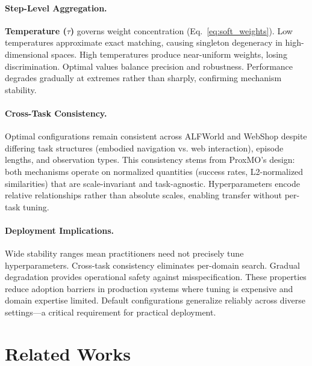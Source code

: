 \documentclass[11pt]{article}
\begin{document}
\paragraph{Step-Level Aggregation.}
\textbf{Temperature ($\tau$)} governs weight concentration (Eq.~\ref{eq:soft_weights}). 
Low temperatures approximate exact matching, causing singleton degeneracy in 
high-dimensional spaces. High temperatures produce near-uniform weights, losing 
discrimination. Optimal values balance precision and robustness. Performance 
degrades gradually at extremes rather than sharply, confirming mechanism stability.

\paragraph{Cross-Task Consistency.}
Optimal configurations remain consistent across ALFWorld and WebShop despite 
differing task structures (embodied navigation vs. web interaction), episode 
lengths, and observation types. This consistency stems from ProxMO's design: 
both mechanisms operate on normalized quantities (success rates, L2-normalized 
similarities) that are scale-invariant and task-agnostic. Hyperparameters encode 
relative relationships rather than absolute scales, enabling transfer without 
per-task tuning.

\paragraph{Deployment Implications.}
Wide stability ranges mean practitioners need not precisely tune hyperparameters. 
Cross-task consistency eliminates per-domain search. Gradual degradation provides 
operational safety against misspecification. These properties reduce adoption 
barriers in production systems where tuning is expensive and domain expertise 
limited. Default configurations generalize reliably across diverse settings—a 
critical requirement for practical deployment.



\section{Related Works}
\label{sec:related}
\end{document}
